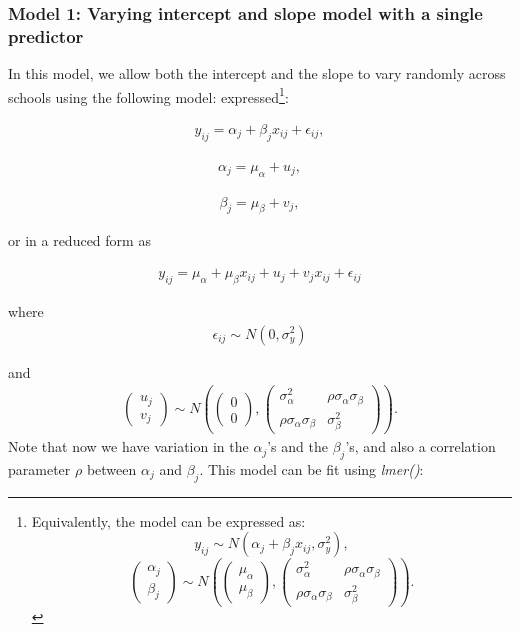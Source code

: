 \subsubsection*{Model 1: Varying intercept and slope model with a single predictor}
In this model, we allow both the intercept and the slope to vary randomly across schools using the following model: expressed\footnote{Equivalently, the model can be expressed as: $$y_{ij}\sim N(\alpha_{j}+\beta_{j}x_{ij} , \sigma_y ^2 ),$$
$$
\left( \begin{matrix} \alpha _{ j } \\ \beta _{ j } \end{matrix} \right) \sim N\left( \left( \begin{matrix} { \mu  }_{ \alpha  } \\ { \mu  }_{ \beta  } \end{matrix} \right) , \left( \begin{matrix} { \sigma  }_{ \alpha  }^{ 2 } & \rho { \sigma  }_{ \alpha  }{ \sigma  }_{ \beta  } \\ \rho { \sigma  }_{ \alpha  }{ \sigma  }_{ \beta  } & { \sigma  }_{ \beta  }^{ 2 } \end{matrix} \right)  \right).$$}:

\begin{align}
	y_{ij} = \alpha_j + \beta_j x_{ij} +\epsilon_{ij},
\end{align}

\begin{align}
	\alpha_j = \mu_\alpha + u_j,
\end{align}

\begin{align}
	\beta_j = \mu_\beta + v_j,
\end{align}

or in a reduced form as
 
\begin{align}
	y_{ij} = \mu_\alpha + \mu_\beta x_{ij} + u_j + v_j x_{ij} + \epsilon_{ij}
\end{align}

where 
\begin{align}
\epsilon_{ij} \sim N(0, \sigma_{y}^{2}) 
\end{align}

and 
\begin{align}
\left( \begin{matrix} u_j \\ v_j \end{matrix} \right) \sim N\left( \left( \begin{matrix} 0 \\ 0 \end{matrix} \right) ,\left( \begin{matrix} { \sigma  }_{ \alpha  }^{ 2 } & \rho { \sigma  }_{ \alpha  }{ \sigma  }_{ \beta  } \\ \rho { \sigma  }_{ \alpha  }{ \sigma  }_{ \beta  } & { \sigma  }_{ \beta  }^{ 2 } \end{matrix} \right)  \right).
\end{align}
Note that now we have variation in the $\alpha_{j}$'s and the $\beta_{j}$'s, and also a correlation parameter $\rho$ between $\alpha_j$ and $\beta_j$. This model can be fit using \textit{lmer()}:

